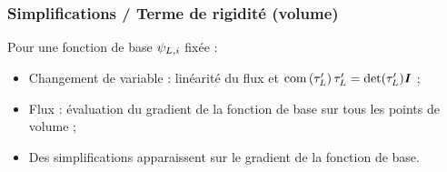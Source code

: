 \begin{frame}
\frametitle{Simplifications / Terme de rigidité (volume)}
\vfill
Pour une fonction de base $\psi_{L,i}$ fixée :
\vfill
\begin{itemize}
\item Changement de variable : linéarité du flux et $\mathrm{com}\left(\tau_{L}'\right) \tau_{L}' = \det (\tau_{L}') \bm{I}$ ;
\item Flux : évaluation du gradient de la fonction de base sur tous les points de volume ;
\item Des simplifications apparaissent sur le gradient de la fonction de base.
\end{itemize}
\vfill
\end{frame}

